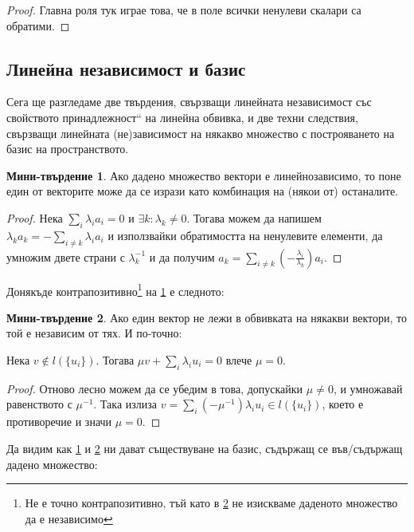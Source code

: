 \documentclass{article}
\newif\ifusemulticols
\theoremstyle{definition}
\newtheorem{miniprop}{Мини-твърдение}[section]
\theoremstyle{remark}
\theoremstyle{plain}
\theoremstyle{plain}
\newenvironment{mymulticols}
    { \ifusemulticols \begin{multicols}{2} \fi }
    { \ifusemulticols \end{multicols} \fi }
\begin{document}
\begin{mymulticols}
\begin{proof}
    Главна роля тук играе това, че в поле всички ненулеви скалари са обратими.
\end{proof}

\subsection*{Линейна независимост и базис}
Сега ще разгледаме две твърдения, свързващи линейната независимост със свойството \quotedblbase
принадлежност`` на линейна обвивка, и две техни следствия, свързващи линейната (не)зависимост на
някакво множество с построяването на базис на пространството.

\begin{miniprop}
    \label{prop:dep_impl_lies_in_span}
    Ако дадено множество вектори е линейнозависимо, то поне един от векторите може да се
    изрази като комбинация на (някои от) останалите.
\end{miniprop}
\begin{proof}
    Нека $\sum_i \lambda_i a_i = 0$ и $\exists k: \lambda_k \not= 0$.
    Тогава можем да напишем $\lambda_k a_k = -\sum_{i\not= k} \lambda_i a_i$ и използвайки
    обратимостта на ненулевите елементи, да умножим двете страни с $\lambda_k^{-1}$ и да получим
    $a_k = \sum_{i \neq k} \left(-\frac{\lambda_i}{\lambda_k}\right) a_i$.
\end{proof}

Донякъде контрапозитивно\footnote{Не е точно контрапозитивно, тъй като в
\ref{prop:not_in_span_inpl_indep} не изискваме даденото множество да е независимо} на
\ref{prop:dep_impl_lies_in_span} е следното:

\begin{miniprop}
    \label{prop:not_in_span_inpl_indep}
    Ако един вектор не лежи в обвивката на някакви вектори, то той е независим от тях. И по-точно:

    Нека $v \not\in l(\{u_i\})$. Тогава $\mu v + \sum_i \lambda_i u_i = 0$ влече $\mu = 0$.
\end{miniprop}
\begin{proof}
    Отново лесно можем да се убедим в това, допускайки $\mu \neq 0$, и умножавай равенството с
    $\mu^{-1}$. Така излиза $v = \sum_i \left(-\mu^{-1}\right)\lambda_i u_i \in l(\{u_i\})$,
    което е противоречие и значи $\mu = 0$.
\end{proof}

Да видим как \ref{prop:dep_impl_lies_in_span} и \ref{prop:not_in_span_inpl_indep} ни дават
съществуване на базис, съдържащ се във/съдържащ дадено множество:


\end{mymulticols}
\end{document}

